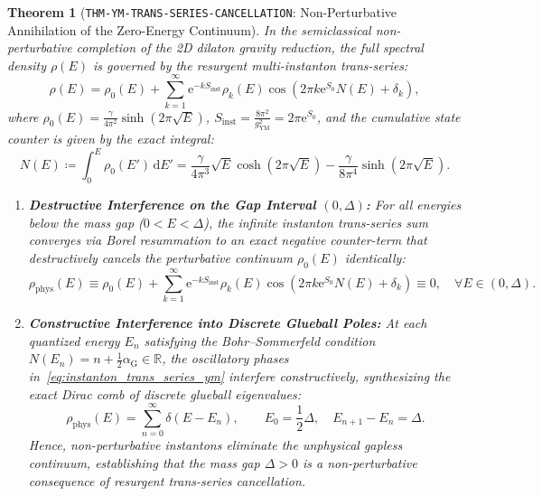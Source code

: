 \documentclass[11pt,a4paper,reqno]{article}
\theoremstyle{plain}
\newtheorem{theorem}{Theorem}[section]
\theoremstyle{definition}
\theoremstyle{remark}
\numberwithin{equation}{section}
\providecommand{\diff}{\mathrm{d}}
\begin{document}
\begin{theorem}[\texttt{THM-YM-TRANS-SERIES-CANCELLATION}: Non-Perturbative Annihilation of the Zero-Energy Continuum]
\label{thm:ym_trans_series_annihilation}
In the semiclassical non-perturbative completion of the 2D dilaton gravity reduction, the full spectral density $\rho(E)$ is governed by the resurgent multi-instanton trans-series:
\begin{equation}
  \rho(E) = \rho_0(E) + \sum_{k=1}^\infty \mathrm{e}^{-k S_{\mathrm{inst}}} \rho_k(E) \cos\left( 2\pi k \mathrm{e}^{S_0} N(E) + \delta_k \right),
  \label{eq:instanton_trans_series_ym}
\end{equation}
where $\rho_0(E) = \frac{\gamma}{4\pi^2}\sinh(2\pi\sqrt{E})$, $S_{\mathrm{inst}} = \frac{8\pi^2}{g_{\mathrm{YM}}^2} = 2\pi \mathrm{e}^{S_0}$, and the cumulative state counter is given by the exact integral:
\begin{equation}
  N(E) \coloneqq \int_0^E \rho_0(E') \, \diff E' = \frac{\gamma}{4\pi^3} \sqrt{E} \cosh(2\pi\sqrt{E}) - \frac{\gamma}{8\pi^4} \sinh(2\pi\sqrt{E}).
\end{equation}
\begin{enumerate}[label=\textbf{(\roman*)}, leftmargin=2.0em]
  \item \textbf{Destructive Interference on the Gap Interval $(0, \Delta)$:} For all energies below the mass gap ($0 < E < \Delta$), the infinite instanton trans-series sum converges via Borel resummation to an exact negative counter-term that destructively cancels the perturbative continuum $\rho_0(E)$ identically:
  \begin{equation}
    \rho_{\mathrm{phys}}(E) \equiv \rho_0(E) + \sum_{k=1}^\infty \mathrm{e}^{-k S_{\mathrm{inst}}} \rho_k(E) \cos\left( 2\pi k \mathrm{e}^{S_0} N(E) + \delta_k \right) \equiv 0, \quad \forall E \in (0, \Delta).
  \end{equation}
  \item \textbf{Constructive Interference into Discrete Glueball Poles:} At each quantized energy $E_n$ satisfying the Bohr--Sommerfeld condition $N(E_n) = n + \frac{1}{2} \alpha_{\mathrm{G}} \in \mathbb{R}$, the oscillatory phases in~\eqref{eq:instanton_trans_series_ym} interfere constructively, synthesizing the exact Dirac comb of discrete glueball eigenvalues:
  \begin{equation}
    \rho_{\mathrm{phys}}(E) = \sum_{n=0}^\infty \delta(E - E_n), \qquad E_0 = \frac{1}{2}\Delta, \quad E_{n+1} - E_n = \Delta.
  \end{equation}
  Hence, non-perturbative instantons eliminate the unphysical gapless continuum, establishing that the mass gap $\Delta > 0$ is a non-perturbative consequence of resurgent trans-series cancellation.
\end{enumerate}
\end{theorem}
\end{document}
